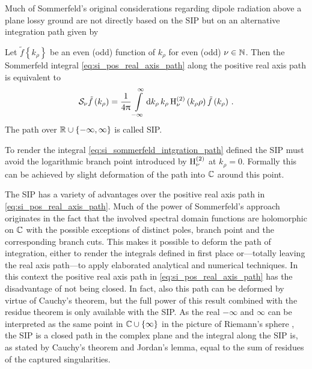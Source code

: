 Much of Sommerfeld's original considerations \cite{Sommerfeld1909} regarding
dipole radiation above a plane lossy ground are not directly based on the
\ac{SIP} but on an alternative integration path given by
\begin{corollary}
	Let $\tilde{f} \left\{k_\rho\right\}$ be an even (odd) function of $k_\rho$
	for even (odd) $\nu \in \mathbb{N}$.
	Then the Sommerfeld integral \eqref{eq:si_pos_real_axis_path}
	along the positive real axis path is equivalent to
	\begin{equation}\label{eq:si_sommerfeld_intgration_path}
		\mathcal{S}_{\nu}{\tilde{f} \left( k_\rho \right)} =
		\frac{1}{4\uppi}
		\int\limits_{-\infty}^{\infty} \mathrm{d} k_\rho \, k_\rho
		\operatorname{H}_{\nu}^{\left( 2 \right)} \left(k_\rho \rho\right)
		\tilde{f} \left(k_\rho\right) \, .
	\end{equation}
	The path over $\mathbb{R} \cup \left\{-\infty, \infty\right\}$
	is called \acf{SIP}\cite[p.~66]{Chew1999}.
\end{corollary}

\begin{remark}
	To render the integral \eqref{eq:si_sommerfeld_intgration_path} defined
	the \ac{SIP} must avoid the logarithmic branch point introduced by
	$\operatorname{H}_{\nu}^{\left( 2 \right)}$ at $k_\rho = 0$.
	Formally this can be achieved by slight deformation of the path into
	$\mathbb{C}$ around this point.
\end{remark}

The \ac{SIP} has a variety of advantages over the positive real axis path in
\eqref{eq:si_pos_real_axis_path}.
Much of the power of Sommerfeld's approach originates in the fact that the
involved spectral domain functions are holomorphic on $\mathbb{C}$ with the possible
exceptions of distinct poles, branch point and the corresponding branch cuts.
This makes it possible to deform the path of integration, either to render
the integrals defined in first place or---totally leaving the real axis
path---to apply elaborated analytical and numerical techniques.
In this context the positive real axis path in \eqref{eq:si_pos_real_axis_path}
has the disadvantage of not being closed.
In fact, also this path can be deformed by virtue of Cauchy's theorem, but
the full power of this result combined with the residue theorem is only
available with the \ac{SIP}.
As the real $-\infty$ and $\infty$ can be interpreted as the same point in
$\mathbb{C} \cup \left\{\infty\right\}$ in the picture of Riemann's sphere
\cite[p.~180]{Meyberg2006}, the \ac{SIP} is a closed path in the complex plane
and the integral along the \ac{SIP} is, as stated by Cauchy's theorem
and Jordan's lemma, equal to the sum of residues of the captured singularities.

